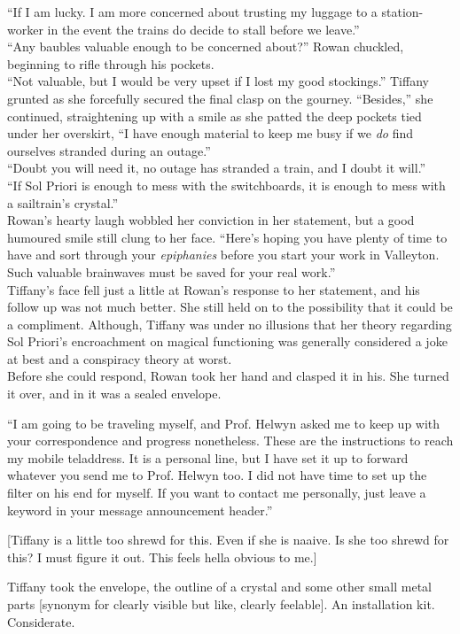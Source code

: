 ``If I am lucky. I am more concerned about trusting my luggage to a station-worker in the event the trains do decide to stall before we leave.''\\

``Any baubles valuable enough to be concerned about?'' Rowan chuckled, beginning to rifle through his pockets.\\

``Not valuable, but I would be very upset if I lost my good stockings.'' Tiffany grunted as she forcefully secured the final clasp on the gourney.
``Besides,'' she continued, straightening up with a smile as she patted the deep pockets tied under her overskirt, 
``I have enough material to keep me busy if we \textit{do} find ourselves stranded during an outage.''\\

``Doubt you will need it, no outage has stranded a train, and I doubt it will.''\\

``If Sol Priori is enough to mess with the switchboards, it is enough to mess with a sailtrain's crystal.''\\

Rowan's hearty laugh wobbled her conviction in her statement, but a good humoured smile still clung to her face.
``Here's hoping you have plenty of time to have and sort through your \textit{epiphanies} before you start your work in Valleyton. 
Such valuable brainwaves must be saved for your real work.''\\

Tiffany's face fell just a little at Rowan's response to her statement, and his follow up was not much better. 
She still held on to the possibility that it could be a compliment. 
Although, Tiffany was under no illusions that her theory regarding Sol Priori's encroachment on magical functioning was generally considered a joke at best and a conspiracy theory at worst.\\

Before she could respond, Rowan took her hand and clasped it in his.
She turned it over, and in it was a sealed envelope.

``I am going to be traveling myself, and Prof. Helwyn asked me to keep up with your correspondence and progress nonetheless. 
These are the instructions to reach my mobile teladdress. 
It is a personal line, but I have set it up to forward whatever you send me to Prof. Helwyn too. 
I did not have time to set up the filter on his end for myself. 
If you want to contact me personally, just leave a keyword in your message announcement header.''

[Tiffany is a little too shrewd for this. Even if she is naaive. Is she too shrewd for this? I must figure it out. This feels hella obvious to me.]

Tiffany took the envelope, the outline of a crystal and some other small metal parts [synonym for clearly visible but like, clearly feelable].
An installation kit.
Considerate.\\

